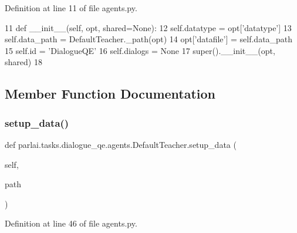 Definition at line 11 of file agents.\+py.


\begin{DoxyCode}
11     \textcolor{keyword}{def }\_\_init\_\_(self, opt, shared=None):
12         self.datatype = opt[\textcolor{stringliteral}{'datatype'}]
13         self.data\_path = DefaultTeacher.\_path(opt)
14         opt[\textcolor{stringliteral}{'datafile'}] = self.data\_path
15         self.id = \textcolor{stringliteral}{'DialogueQE'}
16         self.dialogs = \textcolor{keywordtype}{None}
17         super().\_\_init\_\_(opt, shared)
18 
\end{DoxyCode}


\subsection{Member Function Documentation}
\mbox{\label{classparlai_1_1tasks_1_1dialogue__qe_1_1agents_1_1DefaultTeacher_a6c994266f3f26cd9edbbdeff0ddb672f}} 
\subsubsection{\texorpdfstring{setup\+\_\+data()}{setup\_data()}}
{\footnotesize\ttfamily def parlai.\+tasks.\+dialogue\+\_\+qe.\+agents.\+Default\+Teacher.\+setup\+\_\+data (\begin{DoxyParamCaption}\item[{}]{self,  }\item[{}]{path }\end{DoxyParamCaption})}



Definition at line 46 of file agents.\+py.


